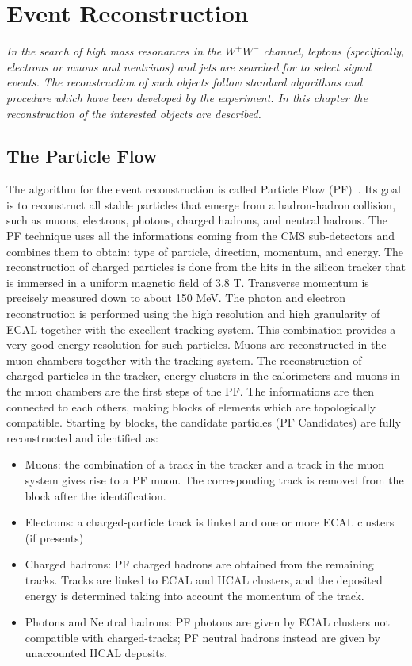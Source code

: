 \chapter{Event Reconstruction}
\label{cap4}

\textit{In the search of high mass resonances in the $W^+W^-$ channel, leptons (specifically, electrons or muons and neutrinos) and jets are searched for to select signal events.
The reconstruction of such objects follow standard algorithms and procedure which have been
developed by the experiment. In this chapter the reconstruction of the interested objects are described.}

\section{The Particle Flow}
\label{PFt}
The algorithm for the event reconstruction is called Particle Flow (PF)~\cite{CMS-PAS-PFT-09-001}. Its goal is to reconstruct all stable particles that emerge from a hadron-hadron collision, such as muons, electrons, photons, charged hadrons, and neutral hadrons. The PF technique uses all the informations coming from the 
CMS sub-detectors and combines them to obtain: type of particle, direction, momentum, and energy.
The reconstruction of charged particles is done from the hits in the silicon tracker that is immersed in a uniform magnetic field of 3.8 T. 
Transverse momentum is precisely measured down to about 150 MeV.
The photon and electron reconstruction is performed using the high resolution and high granularity of ECAL together with the excellent tracking system. This combination provides a very good energy resolution for such particles. Muons are reconstructed in the muon chambers together with the tracking system.
The reconstruction of charged-particles in the tracker, energy clusters in the calorimeters and muons in the muon chambers are the first steps of the PF. The informations are then connected to each others, making blocks of elements which are topologically compatible.
Starting by blocks, the candidate particles (PF Candidates) are fully reconstructed and identified as:
\begin{itemize}
\item Muons: the combination of a track in the tracker and a track in the muon system gives rise to a PF muon. The corresponding track is removed from the block after the identification.
\item Electrons: a charged-particle track is linked and one or more ECAL clusters (if presents)
\item Charged hadrons: PF charged hadrons are obtained from the remaining tracks. Tracks 
are linked to ECAL and HCAL clusters, and the deposited energy is determined taking into
account the momentum of the track.
\item Photons and Neutral hadrons: PF photons are given by ECAL clusters not compatible with charged-tracks; PF
neutral hadrons instead are given by unaccounted HCAL deposits.
\end{itemize}
